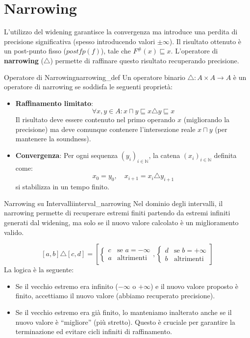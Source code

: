 \section{Narrowing}

L'utilizzo del widening garantisce la convergenza ma introduce una perdita di
precisione significativa (spesso introducendo valori $\pm \infty$).
Il risultato ottenuto è un post-punto fisso ($postfp(f)$), tale che
$F^\#(x) \sqsubseteq x$.
L'operatore di \textbf{narrowing} ($\triangle$) permette di raffinare questo
risultato recuperando precisione.

\begin{definizione}{Operatore di Narrowing}{narrowing_def}
Un operatore binario $\triangle: A \times A \to A$ è un operatore di narrowing
se soddisfa le seguenti proprietà:

\begin{itemize}
    \item \textbf{Raffinamento limitato}:
    \[
    \forall x,y \in A : x \sqcap y \sqsubseteq x \triangle y \sqsubseteq x
    \]
    Il risultato deve essere contenuto nel primo operando $x$ (migliorando la
    precisione) ma deve comunque contenere l'intersezione reale $x \sqcap y$
    (per mantenere la soundness).

    \item \textbf{Convergenza}:
    Per ogni sequenza $(y_i)_{i \in \mathbb{N}}$, la catena $(x_i)_{i \in \mathbb{N}}$ definita come:
    \[
    x_0 = y_0, \quad x_{i+1} = x_i \triangle y_{i+1}
    \]
    si stabilizza in un tempo finito.
\end{itemize}
\end{definizione}

\begin{esempio}{Narrowing su Intervalli}{interval_narrowing}
Nel dominio degli intervalli, il narrowing permette di recuperare estremi
finiti partendo da estremi infiniti generati dal widening, ma solo se il
nuovo valore calcolato è un miglioramento valido.

\[
[a, b] \triangle [c, d] =
\left[
    \begin{cases} c & \text{se } a = -\infty \\ a & \text{altrimenti} \end{cases},
    \begin{cases} d & \text{se } b = +\infty \\ b & \text{altrimenti} \end{cases}
\right]
\]
La logica è la seguente:
\begin{itemize}
    \item Se il vecchio estremo era infinito ($-\infty$ o $+\infty$) e il
    nuovo valore proposto è finito, accettiamo il nuovo valore (abbiamo
    recuperato precisione).
    \item Se il vecchio estremo era già finito, lo manteniamo inalterato
    anche se il nuovo valore è ``migliore'' (più stretto).
    Questo è cruciale per garantire la terminazione ed evitare cicli infiniti
    di raffinamento.
\end{itemize}
\end{esempio}

